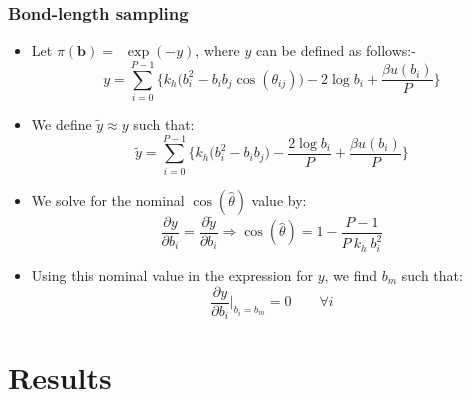 \documentclass[xcolor=svgnames]{beamer}
\begin{document}
        \begin{frame}
            \frametitle{Bond-length sampling}
            \begin{itemize}
                \item Let $\pi(\mathbf{b}) = $~$ \exp (-y)$, where $y$ can be defined as follows:-
                \begin{equation*}
                \label{eq:y}
                    y = \displaystyle\sum\limits_{i=0}^{P-1} \Bigg\{ k_h  \Big( b_i^2 - b_i  b_j  \cos (\theta_{ij}) \Big) - 2  \log b_i + \frac{ \beta  u (b_i)}{P} \Bigg\}
                \end{equation*}
                \item We define $\tilde y \approx y$ such that:
                \begin{equation*}
                \label{eq:ytilde}
                    \tilde y = \displaystyle\sum\limits_{i=0}^{P-1} \Bigg\{ k_h  \Big( b_i^2 - b_i  b_j \Big) - \frac{2  \log b_i}{P} + \frac{ \beta  u (b_i)}{P} \Bigg\}
                \end{equation*}
                \item We solve for the nominal $\cos (\hat \theta)$ value by:
                \begin{equation*}
                \label{eq:thetaHat}
                    \frac{\partial y}{\partial b_i} = \frac{\partial \tilde y}{\partial b_i} \Rightarrow \cos (\hat \theta) = 1 - \frac{P-1}{P~k_h~b_i^2}
                \end{equation*}
                \item Using this nominal value in the expression for $y$, we find $b_m$ such that:
                \begin{equation*}
                \label{eq:bm}
                    \displaystyle\frac{\partial y}{\partial b_i} \bigg|_{b_i = b_m} = 0 \qquad \forall i
                \end{equation*}
            \end{itemize}
        \end{frame}
	\section{Results}
\end{document}
